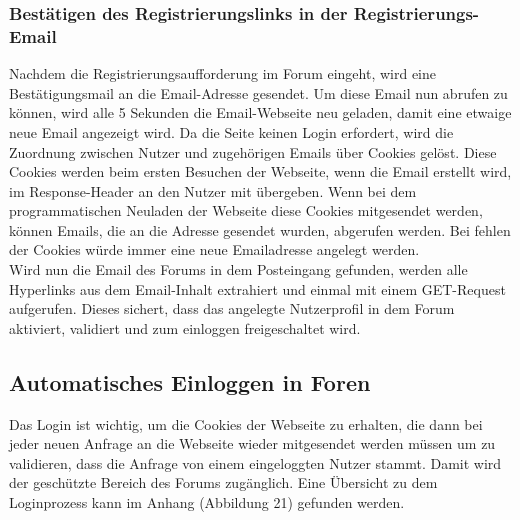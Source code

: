 \subsubsection{Bestätigen des Registrierungslinks in der Registrierungs-Email}
Nachdem die Registrierungsaufforderung im Forum eingeht, wird eine Bestätigungsmail an die Email-Adresse gesendet.
Um diese Email nun abrufen zu können, wird alle 5 Sekunden die Email-Webseite neu geladen, damit eine etwaige neue Email angezeigt wird. Da die Seite keinen Login erfordert, wird die Zuordnung zwischen Nutzer und zugehörigen Emails über Cookies gelöst. Diese Cookies werden beim ersten Besuchen der Webseite, wenn die Email erstellt wird, im Response-Header an den Nutzer mit übergeben. Wenn bei dem programmatischen Neuladen der Webseite diese Cookies mitgesendet werden, können Emails, die an die Adresse gesendet wurden, abgerufen werden. Bei fehlen der Cookies würde immer eine neue Emailadresse angelegt werden.\\
Wird nun die Email des Forums in dem Posteingang gefunden, werden alle Hyperlinks aus dem Email-Inhalt extrahiert und einmal mit einem GET-Request aufgerufen. Dieses sichert, dass das angelegte Nutzerprofil in dem Forum aktiviert, validiert und zum einloggen freigeschaltet wird.


\subsection {Automatisches Einloggen in Foren}
Das Login ist wichtig, um die Cookies der Webseite zu erhalten, die dann bei jeder neuen Anfrage an die Webseite wieder mitgesendet werden müssen um zu validieren, dass die Anfrage von einem eingeloggten Nutzer stammt. Damit wird der geschützte Bereich des Forums zugänglich.
Eine Übersicht zu dem Loginprozess kann im Anhang (Abbildung 21) gefunden werden.

